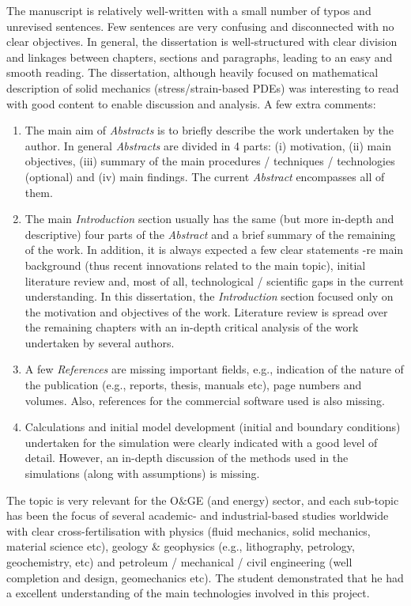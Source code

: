\documentclass[14pt,twoside]{report}
\begin{document}
The manuscript is relatively well-written with a small number of typos and unrevised sentences. Few sentences are very confusing and disconnected with no clear objectives. In general, the dissertation is well-structured with clear division and linkages between chapters, sections and paragraphs, leading to an easy and smooth reading. The dissertation, although heavily focused on mathematical description of solid mechanics (stress/strain-based PDEs) was interesting to read with good content to enable discussion and analysis. A few extra comments:
\begin{enumerate}
\item The main aim of {\it Abstracts} is to briefly describe the work undertaken by the author. In general {\it Abstracts} are divided in 4 parts: (i) motivation, (ii) main objectives, (iii) summary of the main procedures / techniques / technologies (optional) and (iv) main findings. The current {\it Abstract} encompasses all of them.
%
\item The main {\it Introduction} section usually has the same (but more in-depth and descriptive) four parts of the {\it Abstract} and a brief summary of the remaining of the work. In addition, it is always expected a few clear statements -re main background (thus recent innovations related to the main topic), initial literature review and, most of all, technological / scientific gaps in the current understanding. In this dissertation, the {\it Introduction} section focused only on the motivation and objectives of the work. Literature review is spread over the remaining chapters with an in-depth critical analysis of the work undertaken by several authors. 
%
\item A few {\it References} are missing important fields, e.g., indication of the nature of the publication (e.g., reports, thesis, manuals etc), page numbers and volumes. Also, references for the commercial software used is also missing.
%
\item  Calculations and initial model development (initial and boundary conditions) undertaken for the simulation were clearly indicated with a good level of detail. However, an in-depth discussion of the methods used in the simulations (along with assumptions) is missing. 
% 
\end{enumerate}

The topic is very relevant for the O$\&$GE (and energy) sector, and each sub-topic has been the focus of several academic- and industrial-based studies worldwide with clear cross-fertilisation with physics (fluid mechanics, solid mechanics, material science etc), geology $\&$ geophysics (e.g., lithography, petrology, geochemistry, etc) and petroleum / mechanical / civil engineering (well completion and design, geomechanics etc). The student demonstrated that he had a excellent understanding of the main technologies involved in this project.
\end{document}
